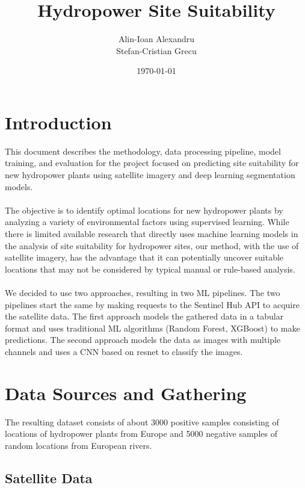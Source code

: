 \documentclass[12pt,a4paper]{article}
\title{Hydropower Site Suitability}
\author{Alin-Ioan Alexandru \\
        Stefan-Cristian Grecu \\}
\date{\today}
\begin{document}
\maketitle

\tableofcontents
\newpage

\section{Introduction}

This document describes the methodology, data processing pipeline, model
training, and evaluation for the project focused on predicting site suitability
for new hydropower plants using satellite imagery and deep learning segmentation
models.
\\
\\
The objective is to identify optimal locations for new hydropower plants by
analyzing a variety of environmental factors using supervised learning. While
there is limited available research that directly uses machine learning models
in the analysis of site suitability for hydropower sites, our method, with the
use of satellite imagery, has the advantage that it can potentially uncover
suitable locations that may not be considered by typical manual or rule-based
analysis.
\\
\\
We decided to use two approaches, resulting in two ML pipelines. The two
pipelines start the same by making requests to the Sentinel Hub API to acquire
the satellite data. The first approach models the gathered data in a tabular
format and uses traditional ML algorithms (Random Forest, XGBoost) to make
predictions. The second approach models the data as images with multiple
channels and uses a CNN based on resnet to classify the images.

\section{Data Sources and Gathering}

The resulting dataset consists of about 3000 positive samples consisting of
locations of hydropower plants from Europe and 5000 negative samples of random
locations from European rivers.

\subsection{Satellite Data}
\end{document}
